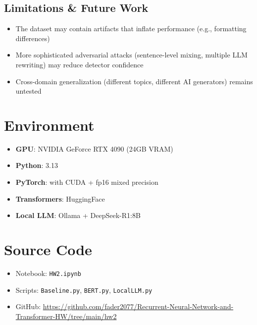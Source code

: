 \documentclass[11pt,a4paper]{article}
\begin{document}
\subsection{Limitations \& Future Work}
\begin{itemize}[nosep]
\item The dataset may contain artifacts that inflate performance (e.g., formatting differences)
\item More sophisticated adversarial attacks (sentence-level mixing, multiple LLM rewriting) may reduce detector confidence
\item Cross-domain generalization (different topics, different AI generators) remains untested
\end{itemize}

\section*{Environment}

\begin{itemize}[nosep]
\item \textbf{GPU}: NVIDIA GeForce RTX 4090 (24GB VRAM)
\item \textbf{Python}: 3.13
\item \textbf{PyTorch}: with CUDA + fp16 mixed precision
\item \textbf{Transformers}: HuggingFace
\item \textbf{Local LLM}: Ollama + DeepSeek-R1:8B
\end{itemize}

\section*{Source Code}

\begin{itemize}[nosep]
\item Notebook: \texttt{HW2.ipynb}
\item Scripts: \texttt{Baseline.py}, \texttt{BERT.py}, \texttt{LocalLLM.py}
\item GitHub: \url{https://github.com/fader2077/Recurrent-Neural-Network-and-Transformer-HW/tree/main/hw2}
\end{itemize}
\end{document}
